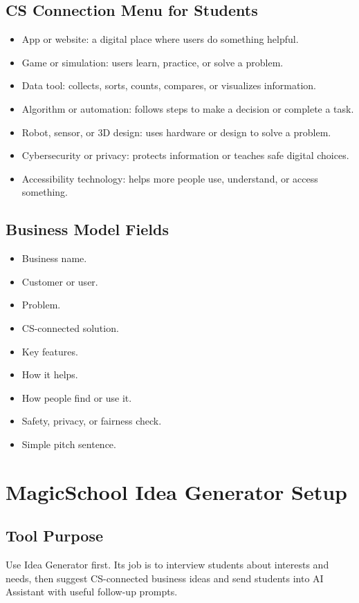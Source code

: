 \documentclass[11pt]{article}
\begin{document}
\subsection{CS Connection Menu for Students}
\begin{itemize}
  \item App or website: a digital place where users do something helpful.
  \item Game or simulation: users learn, practice, or solve a problem.
  \item Data tool: collects, sorts, counts, compares, or visualizes information.
  \item Algorithm or automation: follows steps to make a decision or complete a task.
  \item Robot, sensor, or 3D design: uses hardware or design to solve a problem.
  \item Cybersecurity or privacy: protects information or teaches safe digital choices.
  \item Accessibility technology: helps more people use, understand, or access something.
\end{itemize}

\subsection{Business Model Fields}
\begin{itemize}
  \item Business name.
  \item Customer or user.
  \item Problem.
  \item CS-connected solution.
  \item Key features.
  \item How it helps.
  \item How people find or use it.
  \item Safety, privacy, or fairness check.
  \item Simple pitch sentence.
\end{itemize}

\section{MagicSchool Idea Generator Setup}
\subsection{Tool Purpose}
Use Idea Generator first. Its job is to interview students about interests and needs, then suggest CS-connected business ideas and send students into AI Assistant with useful follow-up prompts.
\end{document}
